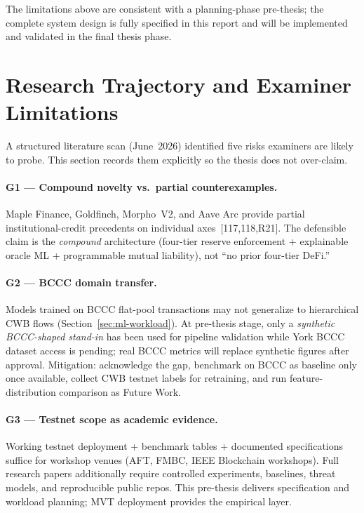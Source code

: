 \documentclass[12pt,a4paper]{report}
\begin{document}
The limitations above are consistent with a planning-phase pre-thesis; the complete system design is fully specified in this report and will be implemented and validated in the final thesis phase.

\section{Research Trajectory and Examiner Limitations}
\label{sec:research-limitations}

A structured literature scan (June~2026) identified five risks examiners are likely to probe. This section records them explicitly so the thesis does not over-claim.

\paragraph{G1 --- Compound novelty vs.\ partial counterexamples.}
Maple Finance, Goldfinch, Morpho~V2, and Aave Arc provide partial institutional-credit precedents on individual axes~[117,118,R21]. The defensible claim is the \textit{compound} architecture (four-tier reserve enforcement + explainable oracle ML + programmable mutual liability), not ``no prior four-tier DeFi.''

\paragraph{G2 --- BCCC domain transfer.}
Models trained on BCCC flat-pool transactions may not generalize to hierarchical CWB flows (Section~\ref{sec:ml-workload}). At pre-thesis stage, only a \textit{synthetic BCCC-shaped stand-in} has been used for pipeline validation while York BCCC dataset access is pending; real BCCC metrics will replace synthetic figures after approval. Mitigation: acknowledge the gap, benchmark on BCCC as baseline only once available, collect CWB testnet labels for retraining, and run feature-distribution comparison as Future Work.

\paragraph{G3 --- Testnet scope as academic evidence.}
Working testnet deployment + benchmark tables + documented specifications suffice for workshop venues (AFT, FMBC, IEEE Blockchain workshops). Full research papers additionally require controlled experiments, baselines, threat models, and reproducible public repos. This pre-thesis delivers specification and workload planning; MVT deployment provides the empirical layer.
\end{document}

